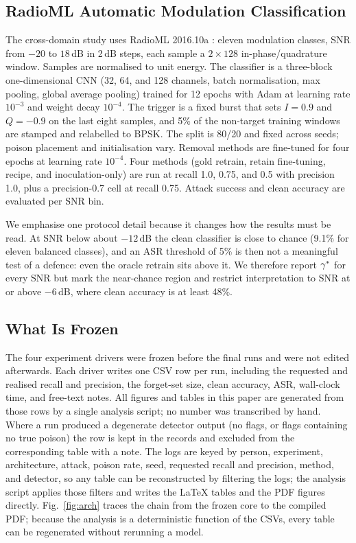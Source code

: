 \subsection{RadioML Automatic Modulation Classification}
The cross-domain study uses RadioML 2016.10a \cite{radioml,radioml_jstsp}: eleven
modulation classes, SNR from $-20$ to $18$\,dB in 2\,dB steps, each sample a
$2\times128$ in-phase/quadrature window. Samples are normalised to unit energy.
The classifier is a three-block one-dimensional CNN (32, 64, and 128 channels,
batch normalisation, max pooling, global average pooling) trained for 12 epochs
with Adam at learning rate $10^{-3}$ and weight decay $10^{-4}$. The trigger is
a fixed burst that sets $I{=}0.9$ and $Q{=}{-}0.9$ on the last eight samples,
and 5\% of the non-target training windows are stamped and relabelled to BPSK.
The split is 80/20 and fixed across seeds; poison placement and initialisation
vary. Removal methods are fine-tuned for four epochs at learning rate $10^{-4}$.
Four methods (gold retrain, retain fine-tuning, recipe, and inoculation-only) are
run at recall 1.0, 0.75, and 0.5 with precision 1.0, plus a precision-0.7 cell at
recall 0.75. Attack success and clean accuracy are evaluated per SNR bin.

We emphasise one protocol detail because it changes how the results must be read.
At SNR below about $-12$\,dB the clean classifier is close to chance (9.1\% for
eleven balanced classes), and an ASR threshold of 5\% is then not a
meaningful test of a defence: even the oracle retrain sits above it. We therefore
report $\gamma^{\ast}$ for every SNR but mark the near-chance region and restrict
interpretation to SNR at or above $-6$\,dB, where clean accuracy is at least
48\%.

\subsection{What Is Frozen}
The four experiment drivers were frozen before the final runs and were not
edited afterwards. Each driver writes one CSV row per run, including the
requested and realised recall and precision, the forget-set size, clean
accuracy, ASR, wall-clock time, and free-text notes. All figures and tables in
this paper are generated from those rows by a single analysis script; no
number was transcribed by hand. Where a run produced a degenerate detector
output (no flags, or flags containing no true poison) the row is kept in the
records and excluded from the corresponding table with a note. The logs are keyed
by person, experiment, architecture, attack, poison rate, seed, requested recall
and precision, method, and detector, so any table can be reconstructed by
filtering the logs; the analysis script applies those filters and writes the
\LaTeX{} tables and the PDF figures directly. Fig.~\ref{fig:arch} traces the
chain from the frozen core to the compiled PDF; because the analysis is a
deterministic function of the CSVs, every table can be regenerated without
rerunning a model.

